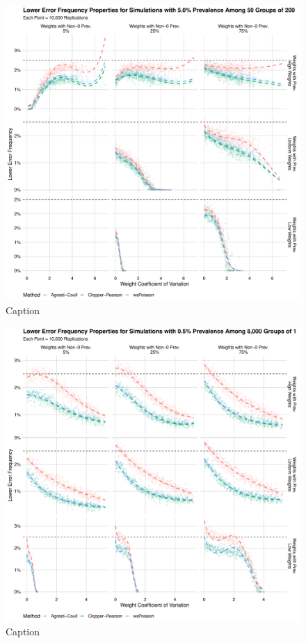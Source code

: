 \documentclass[AMA,STIX1COL]{WileyNJD-v2}
\begin{document}
\begin{figure}
\centering
\includegraphics[width=\textwidth]{figures/perfect_lower_error_frequency_50_groups_0_05_prev.pdf}
\caption{Caption}
\label{fig:perfect_lower_error_frequency_50_groups_0_05_prev}
\end{figure}

\begin{figure}
\centering
\includegraphics[width=\textwidth]{figures/perfect_lower_error_frequency_8000_groups_0_005_prev.pdf}
\caption{Caption}
\label{fig:perfect_lower_error_frequency_8000_groups_0_005_prev}
\end{figure}
\end{document}
